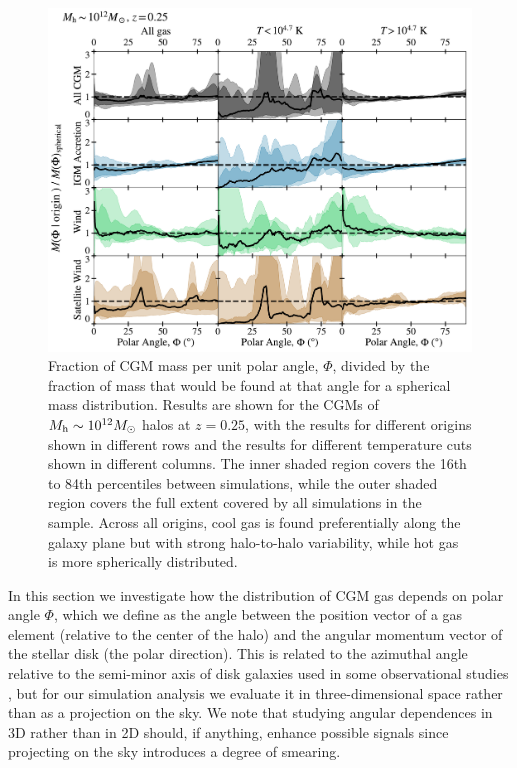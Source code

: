 \documentclass[fleqn,usenatbib]{mnras}
\begin{document}
\begin{figure}
\includegraphics[width=\textwidth]{figures/CGM_polar_dists_m12s_snum465.pdf}
\caption{
Fraction of CGM mass per unit polar angle, $\Phi$, divided by the fraction of mass that would be found at that angle for a spherical mass distribution.
Results are shown for the CGMs of $M_{\rm h} \sim 10^{12} M_\odot$ halos at $z=0.25$, with the results for different origins shown in different rows and the results for different temperature cuts shown in different columns.
The inner shaded region covers the 16th to 84th percentiles between simulations, while the outer shaded region covers the full extent covered by all simulations in the sample.
Across all origins, cool gas is found preferentially along the galaxy plane but with strong halo-to-halo variability, while hot gas is more spherically distributed.
}
\label{fig:CGM_polar_dists_m12s_snum465}
\end{figure}

In this section we investigate how the distribution of CGM gas depends on polar angle $\Phi$, which we define as the angle between the position vector of a gas element (relative to the center of the halo) and the angular momentum vector of the stellar disk (the polar direction). 
This is related to the azimuthal angle relative to the semi-minor axis of disk galaxies used in some observational studies \citep[e.g.,][]{Bordoloi2011,Bordoloi2014,Bouche2012,Kacprzak2015}, but for our simulation analysis we evaluate it in three-dimensional space rather than as a projection on the sky. 
We note that studying angular dependences in 3D rather than in 2D should, if anything, enhance possible signals since projecting on the sky introduces a degree of smearing.
\end{document}
